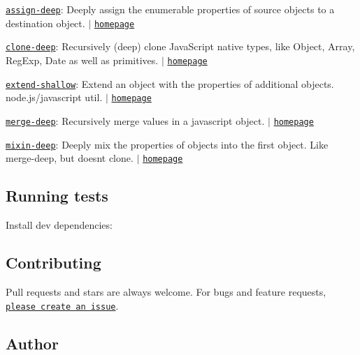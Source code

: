 \begin{DoxyItemize}
\item \href{https://www.npmjs.com/package/assign-deep}{\tt assign-\/deep}\+: Deeply assign the enumerable properties of source objects to a destination object. $\vert$ \href{https://github.com/jonschlinkert/assign-deep}{\tt homepage}
\item \href{https://www.npmjs.com/package/clone-deep}{\tt clone-\/deep}\+: Recursively (deep) clone Java\+Script native types, like Object, Array, Reg\+Exp, Date as well as primitives. $\vert$ \href{https://github.com/jonschlinkert/clone-deep}{\tt homepage}
\item \href{https://www.npmjs.com/package/extend-shallow}{\tt extend-\/shallow}\+: Extend an object with the properties of additional objects. node.\+js/javascript util. $\vert$ \href{https://github.com/jonschlinkert/extend-shallow}{\tt homepage}
\item \href{https://www.npmjs.com/package/merge-deep}{\tt merge-\/deep}\+: Recursively merge values in a javascript object. $\vert$ \href{https://github.com/jonschlinkert/merge-deep}{\tt homepage}
\item \href{https://www.npmjs.com/package/mixin-deep}{\tt mixin-\/deep}\+: Deeply mix the properties of objects into the first object. Like merge-\/deep, but doesn\textquotesingle{}t clone. $\vert$ \href{https://github.com/jonschlinkert/mixin-deep}{\tt homepage}
\end{DoxyItemize}

\subsection*{Running tests}

Install dev dependencies\+:




\subsection*{Contributing}

Pull requests and stars are always welcome. For bugs and feature requests, \href{https://github.com/jonschlinkert/assign-symbols/issues/new}{\tt please create an issue}.

\subsection*{Author}


